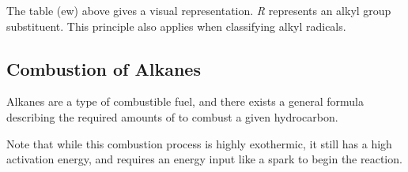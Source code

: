 	The table (ew) above gives a visual representation. \textit{R} represents an alkyl group substituent. This principle
	also applies when classifying alkyl radicals.



\subsection{Combustion of Alkanes}

	Alkanes are a type of combustible fuel, and there exists a general formula describing the required amounts of 
	to combust a given hydrocarbon.


	Note that while this combustion process is highly exothermic, it still has a high activation energy, and requires an energy
	input like a spark to begin the reaction.




















